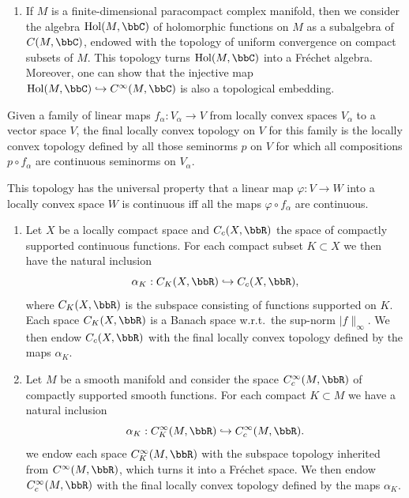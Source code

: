 \begin{example}
\begin{enumerate}[label=(\alph*)]
        \item If $M$ is a finite-dimensional paracompact complex manifold, then we consider the algebra $\mathrm{Hol}(M,\bbC)$ of holomorphic functions on $M$ as a subalgebra of $C(M,\bbC)$, endowed with the topology of uniform convergence on compact subsets of $M$. This topology turns $\mathrm{Hol}(M,\bbC)$ into a Fr\'echet algebra. Moreover, one can show that the injective map $\mathrm{Hol}(M,\bbC)\hookrightarrow C^\infty(M,\bbC)$ is also a topological embedding.
    \end{enumerate}
\end{example}

\begin{defn}
    Given a family of linear maps $f_\alpha:V_\alpha\to V$ from locally convex spaces $V_\alpha$ to a vector space $V$, the final locally convex topology on $V$ for this family is the locally convex topology defined by all those seminorms $p$ on $V$ for which all compositions $p\circ f_\alpha$ are continuous seminorms on $V_\alpha$.

    This topology has the universal property that a linear map $\varphi:V\to W$ into a locally convex space $W$ is continuous iff all the maps $\varphi\circ f_\alpha$ are continuous.
\end{defn}

\begin{example}
    \begin{enumerate}[label=(\alph*)]
        \item Let $X$ be a locally compact space and $C_c(X,\bbR)$ the space of compactly supported continuous functions. For each compact subset $K\subset X$ we then have the natural inclusion
        \[\alpha_K: C_K(X,\bbR)\hookrightarrow C_c(X,\bbR),\]
        where $C_K(X,\bbR)$ is the subspace consisting of functions supported on $K$. Each space $C_K(X,\bbR)$ is a Banach space w.r.t.\ the sup-norm $\lvert f\rVert_\infty$. We then endow $C_c(X,\bbR)$ with the final locally convex topology defined by the maps $\alpha_K$.
        
        \item Let $M$ be a smooth manifold and consider the space $C_c^\infty(M,\bbR)$ of compactly supported smooth functions. For each compact $K\subset M$ we have a natural inclusion
        \[\alpha_K: C_K^\infty(M,\bbR)\hookrightarrow C_c^\infty(M,\bbR).\]
        we endow each space $C^\infty_K(M,\bbR)$ with the subspace topology inherited from $C^\infty(M,\bbR)$, which turns it into a Fr\'echet space. We then endow $C_c^\infty(M,\bbR)$ with the final locally convex topology defined by the maps $\alpha_K$.
    \end{enumerate}
\end{example}

